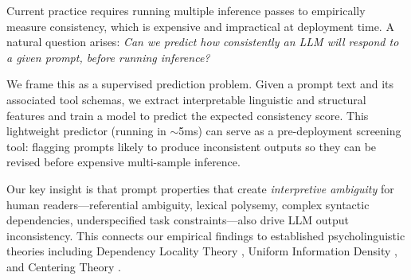 \documentclass{article}
\begin{document}
Current practice requires running multiple inference passes to empirically measure consistency, which is expensive and impractical at deployment time. A natural question arises: \emph{Can we predict how consistently an LLM will respond to a given prompt, before running inference?}

We frame this as a supervised prediction problem. Given a prompt text and its associated tool schemas, we extract interpretable linguistic and structural features and train a model to predict the expected consistency score. This lightweight predictor (running in $\sim$5ms) can serve as a pre-deployment screening tool: flagging prompts likely to produce inconsistent outputs so they can be revised before expensive multi-sample inference.

Our key insight is that prompt properties that create \emph{interpretive ambiguity} for human readers---referential ambiguity, lexical polysemy, complex syntactic dependencies, underspecified task constraints---also drive LLM output inconsistency. This connects our empirical findings to established psycholinguistic theories including Dependency Locality Theory \citep{gibson2000dependency}, Uniform Information Density \citep{jaeger2010redundancy}, and Centering Theory \citep{grosz1995centering}.
\end{document}

